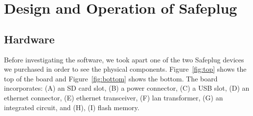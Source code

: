 \section{Design and Operation of Safeplug}
\label{sec:design}

\subsection{Hardware}
Before investigating the software, we took apart one of the two Safeplug devices we purchased in order to see the physical components.  Figure~\ref{fig:top} shows the top of the board and Figure~\ref{fig:bottom} shows the bottom.  The board incorporates: (A) an SD card slot, (B) a power connector, (C) a USB slot, (D) an ethernet connector, (E) ethernet transceiver, (F) lan transformer, (G) an integrated circuit, and (H), (I) flash memory.

